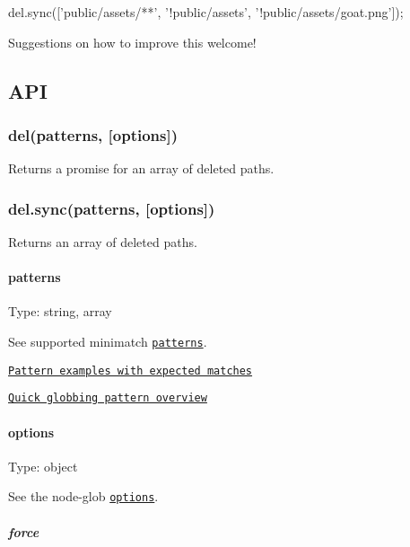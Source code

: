 \begin{DoxyCode}
del.sync(['public/assets/**', '!public/assets', '!public/assets/goat.png']);
\end{DoxyCode}


Suggestions on how to improve this welcome!

\subsection*{A\+PI}

\subsubsection*{del(patterns, \mbox{[}options\mbox{]})}

Returns a promise for an array of deleted paths.

\subsubsection*{del.\+sync(patterns, \mbox{[}options\mbox{]})}

Returns an array of deleted paths.

\paragraph*{patterns}

Type\+: {\ttfamily string}, {\ttfamily array}

See supported minimatch \href{https://github.com/isaacs/minimatch#usage}{\tt patterns}.


\begin{DoxyItemize}
\item \href{https://github.com/sindresorhus/multimatch/blob/master/test.js}{\tt Pattern examples with expected matches}
\item \href{https://github.com/sindresorhus/multimatch#globbing-patterns}{\tt Quick globbing pattern overview}
\end{DoxyItemize}

\paragraph*{options}

Type\+: {\ttfamily object}

See the {\ttfamily node-\/glob} \href{https://github.com/isaacs/node-glob#options}{\tt options}.

\subparagraph*{force}

